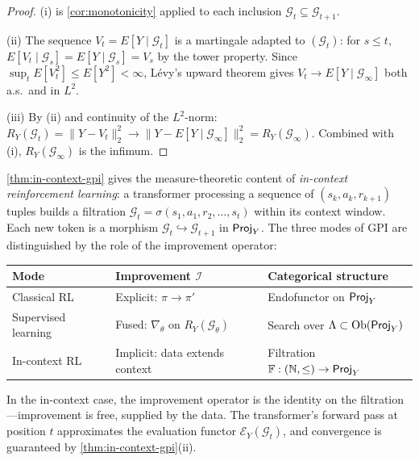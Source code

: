 \begin{proof}
(i) is \cref{cor:monotonicity} applied to each inclusion
$\mathcal{G}_t \subseteq \mathcal{G}_{t+1}$.

(ii) The sequence $V_t = E[Y \mid \mathcal{G}_t]$ is a martingale
adapted to $(\mathcal{G}_t)$: for $s \leq t$,
$E[V_t \mid \mathcal{G}_s] = E[Y \mid \mathcal{G}_s] = V_s$ by the tower
property. Since $\sup_t E[V_t^2] \leq E[Y^2] < \infty$, L\'{e}vy's upward
theorem \cite[Theorem~4.4.5]{Durrett} gives
$V_t \to E[Y \mid \mathcal{G}_\infty]$ both a.s.\ and in $L^2$.

(iii) By (ii) and continuity of the $L^2$-norm:
$R_Y(\mathcal{G}_t) = \|Y - V_t\|_2^2 \to
\|Y - E[Y \mid \mathcal{G}_\infty]\|_2^2 = R_Y(\mathcal{G}_\infty)$.
Combined with (i), $R_Y(\mathcal{G}_\infty)$ is the infimum.
\end{proof}

\begin{remark}\label{rmk:in-context-rl}
\cref{thm:in-context-gpi} gives the measure-theoretic content of
\emph{in-context reinforcement learning}: a transformer processing a
sequence of $(s_k, a_k, r_{k+1})$ tuples builds a filtration
$\mathcal{G}_t = \sigma(s_1, a_1, r_2, \ldots, s_t)$ within its context
window. Each new token is a morphism
$\mathcal{G}_t \hookrightarrow \mathcal{G}_{t+1}$ in $\mathsf{Proj}_Y$. The three
modes of GPI are distinguished by the role of the improvement operator:

\medskip
\begin{center}
\renewcommand{\arraystretch}{1.25}
\small
\begin{tabular}{@{}p{}p{}p{}@{}}
\hline
\textbf{Mode} & \textbf{Improvement $\mathcal{I}$} & \textbf{Categorical structure} \\
\hline
Classical RL & Explicit: $\pi \to \pi'$ & Endofunctor on $\mathsf{Proj}_Y$ \\
Supervised learning & Fused: $\nabla_\theta$ on $R_Y(\mathcal{G}_\theta)$ & Search over $\Lambda \subset \mathrm{Ob}(\mathsf{Proj}_Y)$ \\
In-context RL & Implicit: data extends context & Filtration $\mathbb{F} : (\mathbb{N}, \leq) \to \mathsf{Proj}_Y$ \\
\hline
\end{tabular}
\normalsize
\end{center}
\medskip

\noindent In the in-context case, the improvement operator is the identity
on the filtration---improvement is free, supplied by the data. The
transformer's forward pass at position $t$ approximates the evaluation
functor $\mathcal{E}_Y(\mathcal{G}_t)$, and convergence is guaranteed by
\cref{thm:in-context-gpi}(ii).
\end{remark}

